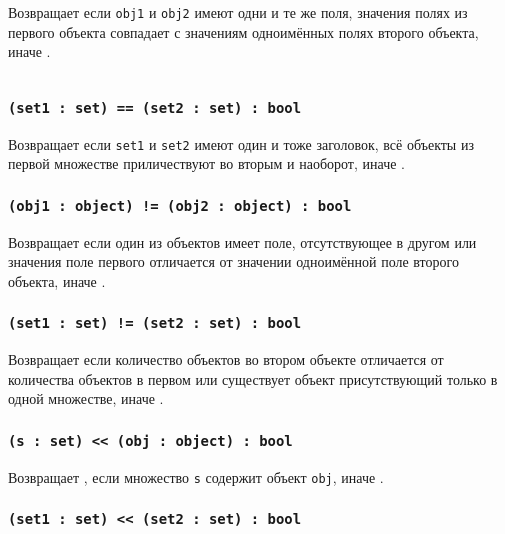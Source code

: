 Возвращает \true{} если \texttt{obj1} и \texttt{obj2} имеют одни и те же поля, значения полях из первого объекта совпадает с значениям одноимённых полях второго объекта, иначе \false{}.

\begin{sourcecode}
	\label{setobjopex}
    \inputminted[linenos]{icl}{../sources/setobjopex.icL}
\end{sourcecode}

\subsubsection{\texttt{(set1 : set) == (set2 : set) : bool}}

Возвращает \true{} если \texttt{set1} и \texttt{set2} имеют один и тоже заголовок, всё объекты из первой множестве приличествуют во вторым и наоборот, иначе \false{}.

\subsubsection{\texttt{(obj1 : object) != (obj2 : object) : bool}}

Возвращает \true{} если один из объектов имеет поле, отсутствующее в другом или значения поле первого отличается от значении одноимённой поле второго объекта, иначе \false{}.

\subsubsection{\texttt{(set1 : set) != (set2 : set) : bool}}

Возвращает \true{} если количество объектов во втором объекте отличается от количества объектов в первом или существует объект присутствующий только в одной множестве, иначе \false{}.

\subsubsection{\texttt{(s : set) << (obj : object) : bool}}

Возвращает \true{}, если множество \texttt{s} содержит объект \texttt{obj}, иначе \false{}.

\subsubsection{\texttt{(set1 : set) << (set2 : set) : bool}}

